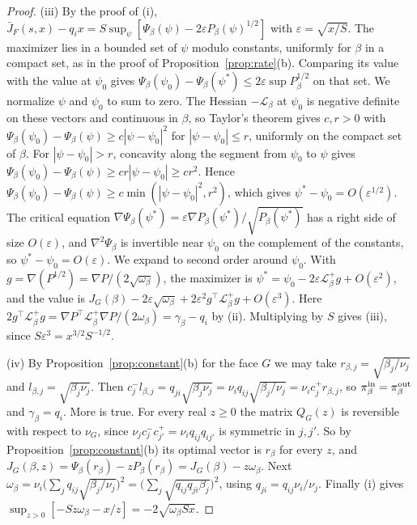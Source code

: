 \begin{proof}
(iii) By the proof of (i), $\bar J_F(s,x)-q_ix=S\sup_\psi[\Psi_\beta(\psi)-2\varepsilon P_\beta(\psi)^{1/2}]$
with $\varepsilon=\sqrt{x/S}$. The maximizer lies in a bounded set of $\psi$ modulo constants,
uniformly for $\beta$ in a compact set, as in the proof of Proposition~\ref{prop:rate}(b).
Comparing its value with the value at $\psi_0$ gives
$\Psi_\beta(\psi_0)-\Psi_\beta(\psi^*)\le2\varepsilon\sup P_\beta^{1/2}$ on that set. We
normalize $\psi$ and $\psi_0$ to sum to zero. The Hessian $-\mathcal L_\beta$ at $\psi_0$ is
negative definite on these vectors and continuous in $\beta$, so Taylor's theorem gives $c,r>0$
with $\Psi_\beta(\psi_0)-\Psi_\beta(\psi)\ge c|\psi-\psi_0|^2$ for $|\psi-\psi_0|\le r$,
uniformly on the compact set of $\beta$. For $|\psi-\psi_0|>r$, concavity along the segment from
$\psi_0$ to $\psi$ gives $\Psi_\beta(\psi_0)-\Psi_\beta(\psi)\ge cr|\psi-\psi_0|\ge cr^2$. Hence
$\Psi_\beta(\psi_0)-\Psi_\beta(\psi)\ge c\min(|\psi-\psi_0|^2,r^2)$, which gives
$\psi^*-\psi_0=O(\varepsilon^{1/2})$. The critical
equation $\nabla\Psi_\beta(\psi^*)=\varepsilon\nabla P_\beta(\psi^*)/\sqrt{P_\beta(\psi^*)}$ has a
right side of size $O(\varepsilon)$, and $\nabla^2\Psi_\beta$ is invertible near $\psi_0$ on the
complement of the constants, so $\psi^*-\psi_0=O(\varepsilon)$. We expand to
second order around $\psi_0$. With $g=\nabla(P^{1/2})=\nabla P/(2\sqrt{\omega_\beta})$, the maximizer
is $\psi^*=\psi_0-2\varepsilon\mathcal L_\beta^+g+O(\varepsilon^2)$, and the value is
$J_G(\beta)-2\varepsilon\sqrt{\omega_\beta}+2\varepsilon^2g^\top\mathcal L_\beta^+g+O(\varepsilon^3)$.
Here $2g^\top\mathcal L_\beta^+g=\nabla P^\top\mathcal L_\beta^+\nabla P/(2\omega_\beta)=\gamma_\beta-q_i$
by (ii). Multiplying by $S$ gives (iii), since $S\varepsilon^3=x^{3/2}S^{-1/2}$.

(iv) By Proposition~\ref{prop:constant}(b) for the face $G$ we may take
$r_{\beta,j}=\sqrt{\beta_j/\nu_j}$ and $l_{\beta,j}=\sqrt{\beta_j\nu_j}$. Then
$c^-_jl_{\beta,j}=q_{ji}\sqrt{\beta_j\nu_j}=\nu_iq_{ij}\sqrt{\beta_j/\nu_j}=\nu_ic^+_jr_{\beta,j}$, so
$\pi^{\rm in}_\beta=\pi^{\rm out}_\beta$ and $\gamma_\beta=q_i$. More is true. For every real
$z\ge0$ the matrix $Q_G(z)$ is reversible with respect to $\nu_G$, since
$\nu_jc^-_jc^+_{j'}=\nu_iq_{ij}q_{ij'}$ is symmetric in $j,j'$. So by
Proposition~\ref{prop:constant}(b) its optimal vector is $r_\beta$ for every $z$, and
$J_G(\beta,z)=\Psi_\beta(r_\beta)-zP_\beta(r_\beta)=J_G(\beta)-z\omega_\beta$. Next
$\omega_\beta=\nu_i\bigl(\sum_jq_{ij}\sqrt{\beta_j/\nu_j}\bigr)^2=\bigl(\sum_j\sqrt{q_{ij}q_{ji}\beta_j}\bigr)^2$,
using $q_{ji}=q_{ij}\nu_i/\nu_j$. Finally (i) gives
$\sup_{z>0}[-Sz\omega_\beta-x/z]=-2\sqrt{\omega_\beta Sx}$.


\end{proof}
